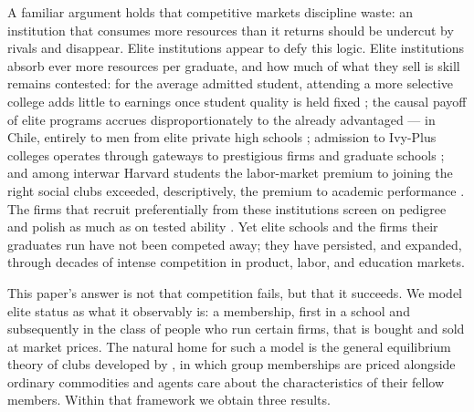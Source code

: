 \documentclass[12pt,letterpaper]{article}
\theoremstyle{definition}
\begin{document}
A familiar argument holds that competitive markets discipline waste: an institution that consumes more resources than it returns should be undercut by rivals and disappear.
Elite institutions appear to defy this logic.
Elite institutions absorb ever more resources per graduate, and how much of what they sell is skill remains contested: for the average admitted student, attending a more selective college adds little to earnings once student quality is held fixed \citep[with the notable exceptions of disadvantaged students, and with returns tracking college resources]{dalekrueger2002}; the causal payoff of elite programs accrues disproportionately to the already advantaged --- in Chile, entirely to men from elite private high schools \citep{zimmerman2019elite}; admission to Ivy-Plus colleges operates through gateways to prestigious firms and graduate schools \citep{chettydemingfriedman2026}; and among interwar Harvard students the labor-market premium to joining the right social clubs exceeded, descriptively, the premium to academic performance \citep{michelmanpricezimmerman2022}.
The firms that recruit preferentially from these institutions screen on pedigree and polish as much as on tested ability \citep{rivera2015pedigree}.
Yet elite schools and the firms their graduates run have not been competed away; they have persisted, and expanded, through decades of intense competition in product, labor, and education markets.

This paper's answer is not that competition fails, but that it succeeds.
We model elite status as what it observably is: a membership, first in a school and subsequently in the class of people who run certain firms, that is bought and sold at market prices.
The natural home for such a model is the general equilibrium theory of clubs developed by \citet{ellickson1999clubs,ellickson2001clubs,ellickson2006organization}, in which group memberships are priced alongside ordinary commodities and agents care about the characteristics of their fellow members.
Within that framework we obtain three results.
\end{document}

